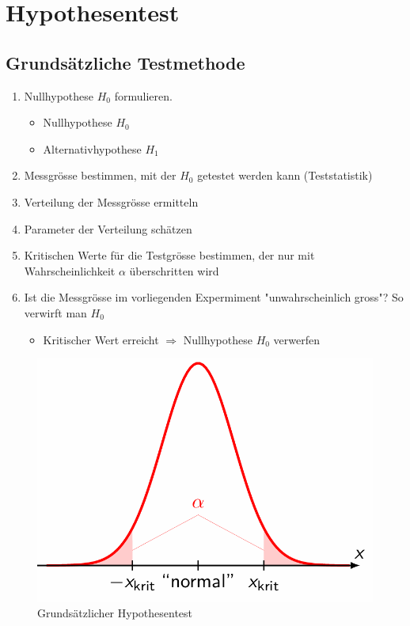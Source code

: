 \documentclass[../Main.tex]{subfiles}
\begin{document}

\section{Hypothesentest}
\subsection{Grundsätzliche Testmethode}
\begin{enumerate}
    \item Nullhypothese \(H_0\) formulieren.
    \begin{itemize}
        \item Nullhypothese \(H_0\)
        \item Alternativhypothese \(H_1\)
    \end{itemize}
    \item Messgrösse bestimmen, mit der \(H_0\) getestet werden kann (Teststatistik)
    \item Verteilung der Messgrösse ermitteln
    \item Parameter der Verteilung schätzen
    \item Kritischen Werte für die Testgrösse bestimmen, der nur mit Wahrscheinlichkeit \(\alpha\) überschritten wird
    \item Ist die Messgrösse im vorliegenden Expermiment "unwahrscheinlich gross"? So verwirft man \(H_0\)
    \begin{itemize}
        \item Kritischer Wert erreicht \(\Rightarrow\) Nullhypothese \(H_0\) verwerfen
    \end{itemize}
\end{enumerate}

\begin{figure}[H]
    \centering
    \includegraphics[width=0.5\linewidth]{Images/hypo-test.png}
    \caption{Grundsätzlicher Hypothesentest}
\end{figure}
\end{document}
